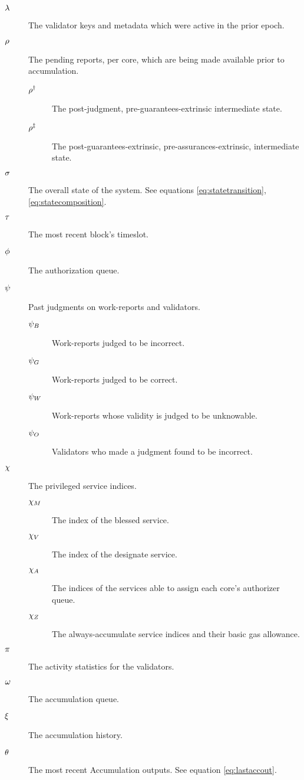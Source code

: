 \begin{description}
  \item[$\lambda$] The validator keys and metadata which were active in the prior epoch. %
  \item[$\rho$] The pending reports, per core, which are being made available prior to accumulation. %
  \begin{description}
    \item[$\rho^\dagger$] The post-judgment, pre-guarantees-extrinsic intermediate state. %
    \item[$\rho^\ddagger$] The post-guarantees-extrinsic, pre-assurances-extrinsic, intermediate state. %
  \end{description}
  \item[$\sigma$] The overall state of the system. See equations \ref{eq:statetransition}, \ref{eq:statecomposition}. %
  \item[$\tau$] The most recent block's timeslot. %
  \item[$\phi$] The authorization queue. %
  \item[$\psi$] Past judgments on work-reports and validators. %
  \begin{description}
    \item[$\psi_B$] Work-reports judged to be incorrect.
    \item[$\psi_G$] Work-reports judged to be correct.
    \item[$\psi_W$] Work-reports whose validity is judged to be unknowable.
    \item[$\psi_O$] Validators who made a judgment found to be incorrect.
  \end{description}
  \item[$\chi$] The privileged service indices. %
  \begin{description}
    \item[$\chi_M$] The index of the blessed service.
    \item[$\chi_V$] The index of the designate service.
    \item[$\chi_A$] The indices of the services able to assign each core's authorizer queue.
    \item[$\chi_Z$] The always-accumulate service indices and their basic gas allowance.
  \end{description}
  \item[$\pi$] The activity statistics for the validators. %
  \item[$\omega$] The accumulation queue. %
  \item[$\xi$] The accumulation history. %
  \item[$\theta$] The most recent Accumulation outputs. See equation \ref{eq:lastaccout}. %
\end{description}

